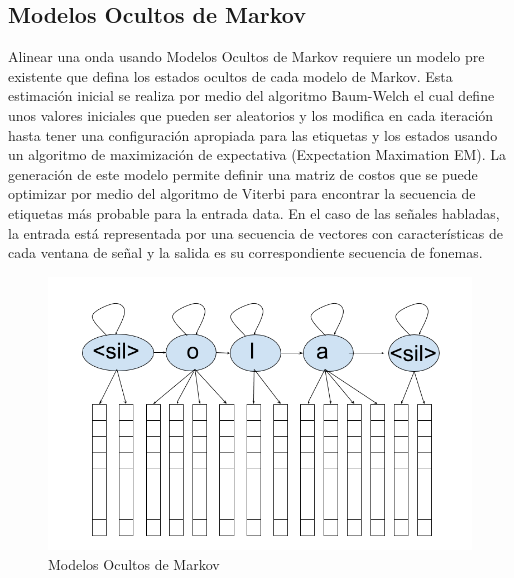 \subsection{Modelos Ocultos de Markov}

Alinear una onda usando Modelos Ocultos de Markov requiere un modelo pre existente que defina los estados ocultos de cada modelo de Markov. Esta estimación inicial se realiza por medio del algoritmo Baum-Welch \cite{RabinerARecognition} el cual define unos valores iniciales que pueden ser aleatorios y los modifica en cada iteración hasta tener una configuración apropiada para las etiquetas y los estados usando un algoritmo de maximización de expectativa (Expectation Maximation EM). La generación de este modelo permite definir una matriz de costos que se puede optimizar por medio del algoritmo de Viterbi para encontrar la secuencia de etiquetas más probable para la entrada data. En el caso de las señales habladas, la entrada está representada por una secuencia de vectores con características de cada ventana de señal y la salida es su correspondiente secuencia de fonemas.

\begin{figure}[H]

\centering
\caption{Modelos Ocultos de Markov}
\label{img:hmm}
\includegraphics[scale=0.50]{imagenes/hmm.png}
\end{figure}

